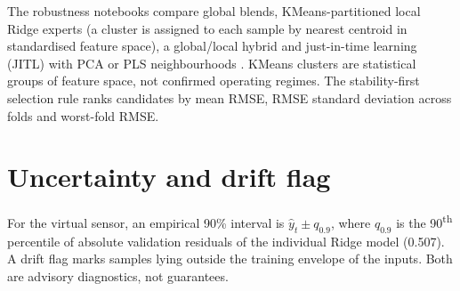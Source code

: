 The robustness notebooks compare global blends, KMeans-partitioned local Ridge experts (a cluster is assigned to each sample by nearest centroid in standardised feature space), a global/local hybrid and just-in-time learning (JITL) with PCA or PLS neighbourhoods \citep{cheng2004jitl}. KMeans clusters are statistical groups of feature space, not confirmed operating regimes. The stability-first selection rule ranks candidates by mean RMSE, RMSE standard deviation across folds and worst-fold RMSE.

\section{Uncertainty and drift flag}
For the virtual sensor, an empirical 90\% interval is $\hat y_t\pm q_{0.9}$, where $q_{0.9}$ is the 90\textsuperscript{th} percentile of absolute validation residuals of the individual Ridge model (0.507). A drift flag marks samples lying outside the training envelope of the inputs. Both are advisory diagnostics, not guarantees.
